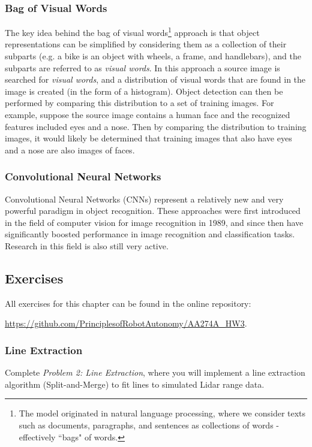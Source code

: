 \subsubsection{Bag of Visual Words}
The key idea behind the bag of visual words\footnote{The model originated in natural language processing, where we consider texts such as documents, paragraphs, and sentences as collections of words - effectively ``bags" of words. 
} approach is that object representations can be simplified by considering them as a collection of their subparts (e.g. a bike is an object with wheels, a frame, and handlebars), and the subparts are referred to as \textit{visual words}. In this approach a source image is searched for \textit{visual words}, and a distribution of visual words that are found in the image is created (in the form of a histogram). Object detection can then be performed by comparing this distribution to a set of training images. For example, suppose the source image contains a human face and the recognized features included eyes and a nose. Then by comparing the distribution to training images, it would likely be determined that training images that also have eyes and a nose are also images of faces.

\subsubsection{Convolutional Neural Networks}
Convolutional Neural Networks (CNNs) represent a relatively new and very powerful paradigm in object recognition. These approaches were first introduced in the field of computer vision for image recognition in 1989, and since then have significantly boosted performance in image recognition and classification tasks. Research in this field is also still very active.


\subsection{Exercises}
All exercises for this chapter can be found in the online repository:

\vspace{\baselineskip}

\url{https://github.com/PrinciplesofRobotAutonomy/AA274A_HW3}.

\subsubsection{Line Extraction}
Complete \textit{Problem 2: Line Extraction}, where you will implement a line extraction algorithm (Split-and-Merge) to fit lines to simulated Lidar range data.

